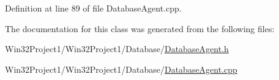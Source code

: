 Definition at line 89 of file Database\+Agent.\+cpp.



The documentation for this class was generated from the following files\+:\begin{DoxyCompactItemize}
\item 
Win32\+Project1/\+Win32\+Project1/\+Database/\hyperlink{_database_agent_8h}{Database\+Agent.\+h}\item 
Win32\+Project1/\+Win32\+Project1/\+Database/\hyperlink{_database_agent_8cpp}{Database\+Agent.\+cpp}\end{DoxyCompactItemize}
